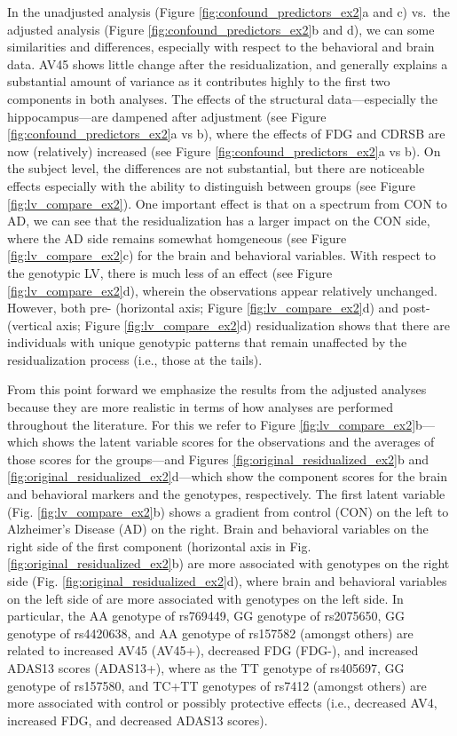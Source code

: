 \documentclass[12pt]{article}
\begin{document}
In the unadjusted analysis (Figure \ref{fig:confound_predictors_ex2}a
and c) vs.~the adjusted analysis (Figure
\ref{fig:confound_predictors_ex2}b and d), we can some similarities and
differences, especially with respect to the behavioral and brain data.
AV45 shows little change after the residualization, and generally
explains a substantial amount of variance as it contributes highly to
the first two components in both analyses. The effects of the structural
data---especially the hippocampus---are dampened after adjustment (see
Figure \ref{fig:confound_predictors_ex2}a vs b), where the effects of
FDG and CDRSB are now (relatively) increased (see Figure
\ref{fig:confound_predictors_ex2}a vs b). On the subject level, the
differences are not substantial, but there are noticeable effects
especially with the ability to distinguish between groups (see Figure
\ref{fig:lv_compare_ex2}). One important effect is that on a spectrum
from CON to AD, we can see that the residualization has a larger impact
on the CON side, where the AD side remains somewhat homgeneous (see
Figure \ref{fig:lv_compare_ex2}c) for the brain and behavioral
variables. With respect to the genotypic LV, there is much less of an
effect (see Figure \ref{fig:lv_compare_ex2}d), wherein the observations
appear relatively unchanged. However, both pre- (horizontal axis; Figure
\ref{fig:lv_compare_ex2}d) and post- (vertical axis; Figure
\ref{fig:lv_compare_ex2}d) residualization shows that there are
individuals with unique genotypic patterns that remain unaffected by the
residualization process (i.e., those at the tails).

From this point forward we emphasize the results from the adjusted
analyses because they are more realistic in terms of how analyses are
performed throughout the literature. For this we refer to Figure
\ref{fig:lv_compare_ex2}b---which shows the latent variable scores for
the observations and the averages of those scores for the groups---and
Figures \ref{fig:original_residualized_ex2}b and
\ref{fig:original_residualized_ex2}d---which show the component scores
for the brain and behavioral markers and the genotypes, respectively.
The first latent variable (Fig. \ref{fig:lv_compare_ex2}b) shows a
gradient from control (CON) on the left to Alzheimer's Disease (AD) on
the right. Brain and behavioral variables on the right side of the first
component (horizontal axis in Fig. \ref{fig:original_residualized_ex2}b)
are more associated with genotypes on the right side (Fig.
\ref{fig:original_residualized_ex2}d), where brain and behavioral
variables on the left side of are more associated with genotypes on the
left side. In particular, the AA genotype of rs769449, GG genotype of
rs2075650, GG genotype of rs4420638, and AA genotype of rs157582
(amongst others) are related to increased AV45 (AV45+), decreased FDG
(FDG-), and increased ADAS13 scores (ADAS13+), where as the TT genotype
of rs405697, GG genotype of rs157580, and TC+TT genotypes of rs7412
(amongst others) are more associated with control or possibly protective
effects (i.e., decreased AV4, increased FDG, and decreased ADAS13
scores).
\end{document}
